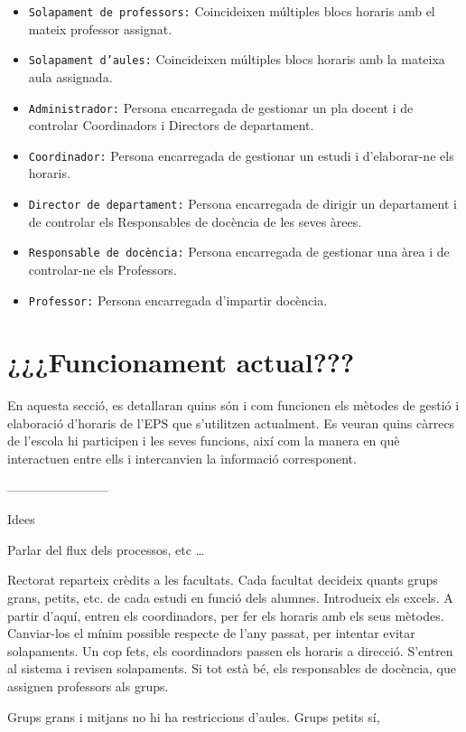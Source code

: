 \documentclass[a4paper,12pt]{ThesisStyle}
\begin{document}
\begin{itemize}
  \item \texttt{Solapament de professors:} Coincideixen múltiples blocs horaris amb el mateix professor assignat.
  \item \texttt{Solapament d'aules:} Coincideixen múltiples blocs horaris amb la mateixa aula assignada.
  \item \texttt{Administrador:} Persona encarregada de gestionar un pla docent i de controlar Coordinadors i Directors de departament.
  \item \texttt{Coordinador:} Persona encarregada de gestionar un estudi i d'elaborar-ne els horaris.
  \item \texttt{Director de departament:} Persona encarregada de dirigir un departament i de controlar els Responsables de docència de les seves àrees.
  \item \texttt{Responsable de docència:} Persona encarregada de gestionar una àrea i de controlar-ne els Professors.
  \item \texttt{Professor:} Persona encarregada d'impartir docència.
\end{itemize}

\section{¿¿¿Funcionament actual???}
\label{sec:funcionament_actual}

En aquesta secció, es detallaran quins són i com funcionen els mètodes de gestió i elaboració d'horaris de l'EPS que s'utilitzen actualment. Es veuran quins càrrecs de l'escola hi participen i les seves funcions, així com la manera en què interactuen entre ells i intercanvien la informació corresponent.

------------------------

Idees

Parlar del flux dels processos, etc \ldots

Rectorat reparteix crèdits a les facultats. Cada facultat decideix quants grups grans, petits, etc. de cada estudi en funció dels alumnes. Introdueix els excels.
A partir d'aquí, entren els coordinadors, per fer els horaris amb els seus mètodes. Canviar-los el mínim possible respecte de l'any passat, per intentar evitar
solapaments. Un cop fets, els coordinadors passen els horaris a direcció. S'entren al sistema i revisen solapaments. Si tot està bé, els responsables de docència,
que assignen professors als grups.

Grups grans i mitjans no hi ha restriccions d'aules. Grups petits sí,
\end{document}
